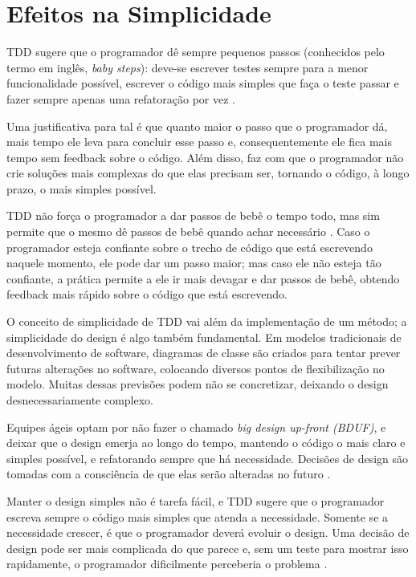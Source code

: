 \section{Efeitos na Simplicidade}

TDD sugere que o programador dê sempre pequenos passos (conhecidos pelo termo em
inglês, \textit{baby steps}): deve-se escrever testes sempre para a menor
funcionalidade possível, escrever o código mais simples que faça o teste passar
e fazer sempre apenas uma refatoração por vez \cite{TDDByExample}.

Uma justificativa para tal é que quanto maior o passo que o programador dá, mais
tempo ele leva para concluir esse passo e, consequentemente ele fica mais tempo
sem feedback sobre o código. Além disso, faz com que o programador não crie
soluções mais complexas do que elas precisam ser, tornando o código, à longo
prazo, o mais simples possível.

TDD não força o programador a dar passos de bebê o tempo todo, mas sim
permite que o mesmo dê passos de bebê quando achar necessário
\cite{TDDByExample}. Caso o programador esteja confiante sobre o trecho de
código que está escrevendo naquele momento, ele pode dar um passo maior;  mas
caso ele não esteja tão confiante, a prática permite a ele ir mais devagar e 
dar passos de bebê, obtendo feedback mais rápido sobre o código que está
escrevendo.

O conceito de simplicidade de TDD vai além da implementação de um método; a
simplicidade do design é algo também fundamental. Em modelos tradicionais de
desenvolvimento de software, diagramas de classe são criados para tentar prever
futuras alterações no software, colocando diversos pontos de flexibilização no
modelo. Muitas dessas previsões podem não se concretizar, deixando o design
desnecessariamente complexo.

Equipes ágeis optam por não fazer o chamado \textit{big design up-front (BDUF)},
e deixar que o design emerja ao longo do tempo, mantendo o código o mais claro e
simples possível, e refatorando sempre que há necessidade. Decisões de
design são tomadas com a consciência de que elas serão alteradas no futuro
\cite{is-design-dead}.

Manter o design simples não é tarefa fácil, e TDD sugere que o programador
escreva sempre o código mais simples que atenda a necessidade. Somente se a
necessidade crescer, é que o programador deverá evoluir o design. Uma decisão de
design pode ser mais complicada do que parece e, sem um teste para mostrar isso
rapidamente, o programador dificilmente perceberia o problema \cite{aim-fire}.

